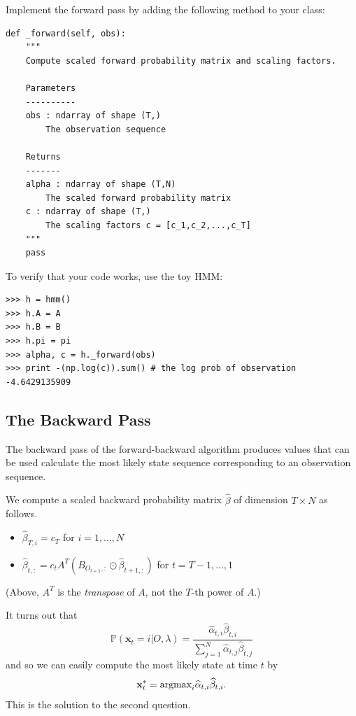 \begin{problem}
Implement the forward pass by adding the following method to your class:
\begin{lstlisting}
def _forward(self, obs):
    """
    Compute scaled forward probability matrix and scaling factors.

    Parameters
    ----------
    obs : ndarray of shape (T,)
        The observation sequence

    Returns
    -------
    alpha : ndarray of shape (T,N)
        The scaled forward probability matrix
    c : ndarray of shape (T,)
        The scaling factors c = [c_1,c_2,...,c_T]
    """
    pass
\end{lstlisting}
To verify that your code works, use the toy HMM:
\begin{lstlisting}
>>> h = hmm()
>>> h.A = A
>>> h.B = B
>>> h.pi = pi
>>> alpha, c = h._forward(obs)
>>> print -(np.log(c)).sum() # the log prob of observation
-4.6429135909
\end{lstlisting}
\end{problem}

\subsection*{The Backward Pass}
The backward pass of the forward-backward algorithm produces values that can be used calculate the most likely state sequence corresponding to an observation sequence.

We compute a scaled backward probability matrix $\widehat{\beta}$ of dimension $T \times N$ as follows.
\begin{itemize}
 \item $\widehat{\beta}_{T,i} = c_{T}$ for $i = 1,\ldots, N$
 \item $\widehat{\beta}_{t,:} = c_{t}A^T(B_{O_{t+1},:}\odot \widehat{\beta}_{t+1,:})$ for $t = T-1, \ldots, 1$
\end{itemize}
(Above, $A^T$ is the \emph{transpose} of $A$, not the $T$-th power of $A$.)

It turns out that
\begin{equation*}
\mathbb{P}(\mathbf{x}_{t} = i | O, \lambda) = \frac{\widehat{\alpha}_{t,i}\widehat{\beta}_{t,i}}{\sum_{j=1}^{N} \widehat{\alpha}_{t,j}\widehat{\beta}_{t,j}}
\end{equation*}
and so we can easily compute the most likely state at time $t$ by
\begin{equation*}
\mathbf{x}_{t}^{*} = \mbox{argmax}_{i} \widehat{\alpha}_{t,i} \widehat{\beta}_{t,i}.
\end{equation*}
This is the solution to the second question.

